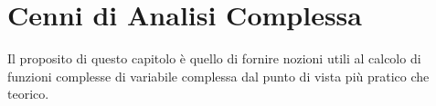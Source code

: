 \chapter{Cenni di Analisi Complessa}\label{ap:B}
Il proposito di questo capitolo \`e quello di fornire nozioni utili al calcolo di funzioni complesse di variabile complessa dal punto di vista pi\`u pratico che teorico.
\begin{definition}
    
\end{definition}